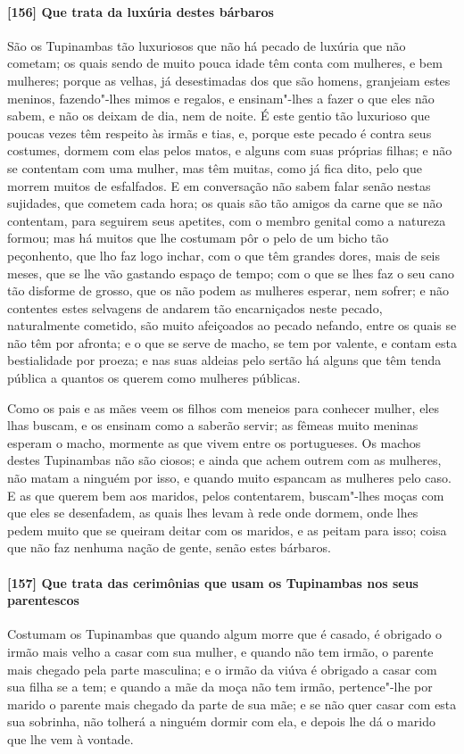 \begin{linenumbers}
\paragraph{[156] Que trata da luxúria destes bárbaros}\quad
São os Tupinambas tão luxuriosos que não há pecado de luxúria que não cometam; os quais
sendo de muito pouca idade têm conta com mulheres, e bem mulheres; porque as velhas, já
desestimadas dos que são homens, granjeiam estes meninos, fazendo"-lhes mimos e regalos, e
ensinam"-lhes a fazer o que eles não sabem, e não os deixam de dia, nem de noite. É este
gentio tão luxurioso que poucas vezes têm respeito às irmãs e tias, e, porque este pecado
é contra seus costumes, dormem com elas pelos matos, e alguns com suas próprias filhas; e
não se contentam com uma mulher, mas têm muitas, como já fica dito, pelo que morrem muitos
de esfalfados. E em conversação não sabem falar senão nestas sujidades, que cometem cada
hora; os quais são tão amigos da carne que se não contentam, para seguirem seus apetites,
com o membro genital como a natureza formou; mas há muitos que lhe costumam pôr o pelo de
um bicho tão peçonhento, que lho faz logo inchar, com o que têm grandes dores, mais de
seis meses, que se lhe vão gastando espaço de tempo; com o que se lhes faz o seu cano tão
disforme de grosso, que os não podem as mulheres esperar, nem sofrer; e não contentes
estes selvagens de andarem tão encarniçados neste pecado, naturalmente cometido, são muito
afeiçoados ao pecado nefando, entre os quais se não têm por afronta; e o que se serve de
macho, se tem por valente, e contam esta bestialidade por proeza; e nas suas aldeias pelo
sertão há alguns que têm tenda pública a quantos os querem como mulheres públicas.

Como os pais e as mães veem os filhos com meneios para conhecer mulher, eles lhas buscam,
e os ensinam como a saberão servir; as fêmeas muito meninas esperam o macho, mormente as
que vivem entre os portugueses. Os machos destes Tupinambas não são ciosos; e ainda que
achem outrem com as mulheres, não matam a ninguém por isso, e quando muito espancam as
mulheres pelo caso. E as que querem bem aos maridos, pelos contentarem, buscam"-lhes moças
com que eles se desenfadem, as quais lhes levam à rede onde dormem, onde lhes pedem muito
que se queiram deitar com os maridos, e as peitam para isso; coisa que não faz nenhuma
nação de gente, senão estes bárbaros.

\paragraph{[157] Que trata das cerimônias que usam os Tupinambas nos seus parentescos}\quad
Costumam os Tupinambas que quando algum morre que é casado, é obrigado o irmão mais velho
a casar com sua mulher, e quando não tem irmão, o parente mais chegado pela parte
masculina; e o irmão da viúva é obrigado a casar com sua filha se a tem; e quando a mãe da
moça não tem irmão, pertence"-lhe por marido o parente mais chegado da parte de sua mãe; e
se não quer casar com esta sua sobrinha, não tolherá a ninguém dormir com ela, e depois
lhe dá o marido que lhe vem à vontade.


\end{linenumbers}
